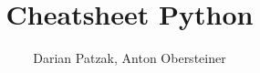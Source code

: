 \usepackage{xcolor}
\usepackage{listings}


\title{Cheatsheet Python}
\author{Darian Patzak, Anton Obersteiner}
